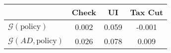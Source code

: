 \begin{tabular}{@{}lccc@{}} 
\toprule 
                          & Check      & UI    & Tax Cut    \\  \midrule 
$\mathcal{G}(\text{policy})$ & 0.002  & 0.059  & -0.001     \\ 
$\mathcal{G}(AD,\text{policy})$ & 0.026  & 0.078  & 0.009     \\ 
\end{tabular}  
